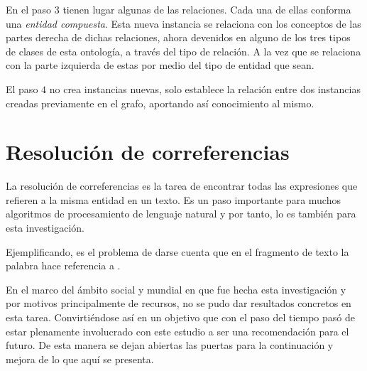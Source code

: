 En el paso $3$ tienen lugar algunas de las relaciones. Cada una de ellas conforma una \textit{entidad compuesta}. Esta nueva instancia se relaciona con los conceptos de las partes derecha de dichas relaciones, ahora devenidos en alguno de los tres tipos de clases de esta ontología, a través del tipo de relación. A la vez que se relaciona con la parte izquierda de estas por medio del tipo de entidad que sean.

El paso $4$ no crea instancias nuevas, solo establece la relación entre dos instancias creadas previamente en el grafo, aportando así conocimiento al mismo.

\section{Resolución de correferencias}
La resolución de correferencias es la tarea de encontrar todas las expresiones que refieren a la misma entidad en un texto. Es un paso importante para muchos algoritmos de procesamiento de lenguaje natural y por tanto, lo es también para esta investigación.

Ejemplificando, es el problema de darse cuenta que en el fragmento de texto  la palabra  hace referencia a .

En el marco del ámbito social y mundial en que fue hecha esta investigación y por motivos principalmente de recursos, no se pudo dar resultados concretos en esta tarea. Convirtiéndose así en un objetivo que con el paso del tiempo pasó de estar plenamente involucrado con este estudio a ser una recomendación para el futuro. De esta manera se dejan abiertas las puertas para la continuación y mejora de lo que aquí se presenta.